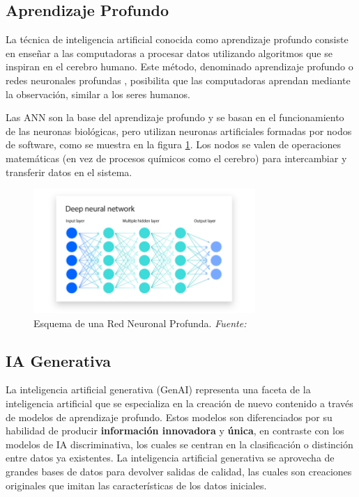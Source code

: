 \subsection{Aprendizaje Profundo}

La técnica de inteligencia artificial conocida como aprendizaje profundo consiste en enseñar a las computadoras a procesar datos utilizando algoritmos que se inspiran en el cerebro humano. Este método, denominado aprendizaje profundo o redes neuronales profundas \cite{IBM}, posibilita que las computadoras aprendan mediante la observación, similar a los seres humanos.

Las \acrfull{ANN} son la base del aprendizaje profundo y se basan en el funcionamiento de las neuronas biológicas, pero utilizan neuronas artificiales formadas por nodos de software, como se muestra en la figura \ref{fig:2_Deep Neuronal Network}. Los nodos se valen de operaciones matemáticas (en vez de procesos químicos como el cerebro) para intercambiar y transferir datos en el sistema.

\begin{figure}[hp!]
  \centering
  \includegraphics[width=0.75\textwidth]{imaxes/2_Deep Neuronal Network.png}
\caption[Esquema de una Red Neuronal Profunda]{Esquema de una Red Neuronal Profunda. \textit{Fuente: \cite{ResearchGate2024}}}
  \label{fig:2_Deep Neuronal Network}
\end{figure}

\subsection{IA Generativa}
\label{subsec:iagenerativa}


La inteligencia artificial generativa (\acrshort{GenAI}) \cite{IAGenerativa} representa una faceta de la inteligencia artificial que se especializa en la creación de nuevo contenido a través de modelos de aprendizaje profundo. Estos modelos son diferenciados por su habilidad de producir \textbf{ información innovadora} y \textbf{única}, en contraste con los modelos de IA discriminativa, los cuales se centran en la clasificación o distinción entre datos ya existentes. La inteligencia artificial generativa se aprovecha de grandes bases de datos para devolver salidas de calidad, las cuales son creaciones originales que imitan las características de los datos iniciales.


